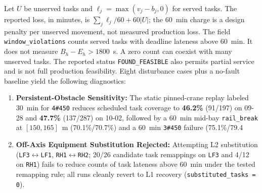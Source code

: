 \documentclass[11pt,a4paper]{article}
\begin{document}
Let $U$ be unserved tasks and $\ell_j=\max(v_j-b_j,0)$ for served tasks. The reported loss, in minutes, is $\sum_j\ell_j/60+60|U|$; the 60~min charge is a design penalty per unserved movement, not measured production loss. The field \texttt{window\_violations} counts served tasks with deadline lateness above 60~min. It does not measure $B_h-E_h>1800$~s. A zero count can coexist with many unserved tasks. The reported status \texttt{FOUND\_FEASIBLE} also permits partial service and is not full production feasibility. Eight disturbance cases plus a no-fault baseline yield the following diagnostics:
\begin{enumerate}[leftmargin=1.5em,itemsep=2pt]
  \item \textbf{Persistent-Obstacle Sensitivity:} The static pinned-crane replay labeled 30~min for \texttt{4\#450} reduces scheduled task coverage to \textbf{46.2\%} (91/197) on 09-28 and \textbf{47.7\%} (137/287) on 10-02, followed by a 60~min mid-bay \texttt{rail\_break} at $[150,165]$~m (70.1\%/70.7\%) and a 60~min \texttt{3\#450} failure (75.1\%/79.4%
  \item \textbf{Off-Axis Equipment Substitution Rejected:} Attempting L2 substitution (\texttt{LF3}$\leftrightarrow$\texttt{LF1}, \texttt{RH1}$\leftrightarrow$\texttt{RH2}; 20/26 candidate task remappings on \texttt{LF3} and 4/12 on \texttt{RH1}) fails to reduce counts of task lateness above 60~min under the tested remapping rule; all runs cleanly revert to L1 recovery (\texttt{substituted\_tasks = 0}).
\end{enumerate}
\end{document}
